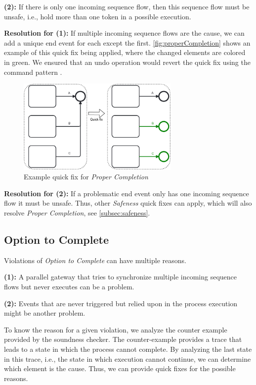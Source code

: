 \documentclass[runningheads]{llncs}
\begin{document}
\textbf{(2):} If there is only one incoming sequence flow, then this sequence flow must be unsafe, i.e., hold more than one token in a possible execution.

\textbf{Resolution for (1):} If multiple incoming sequence flows are the cause, we can add a unique end event for each except the first. 
\autoref{fig:properCompletion} shows an example of this quick fix being applied, where the changed elements are colored in green.
We ensured that an undo operation would revert the quick fix using the command pattern \cite{gammaDesignPatternsElements1995}.

\begin{figure}[ht]
	\centering
	\includegraphics[width=0.7\textwidth]{images/properCompletion}
	\caption{Example quick fix for \textit{Proper Completion}}
	\label{fig:properCompletion}
\end{figure}

\textbf{Resolution for (2):} If a problematic end event only has one incoming sequence flow it must be unsafe.
Thus, other \textit{Safeness} quick fixes can apply, which will also resolve \textit{Proper Completion}, see \autoref{subsec:safeness}.


\subsection{Option to Complete} \label{subsec:optionToComplete}
Violations of \textit{Option to Complete} can have multiple reasons.

\textbf{(1):} A parallel gateway that tries to synchronize multiple incoming sequence flows but never executes can be a problem.

\textbf{(2):} Events that are never triggered but relied upon in the process execution might be another problem.

To know the reason for a given violation, we analyze the counter example provided by the soundness checker.
The counter-example provides a trace that leads to a state in which the process cannot complete.
By analyzing the last state in this trace, i.e., the state in which execution cannot continue, we can determine which element is the cause.
Thus, we can provide quick fixes for the possible reasons.
\end{document}
